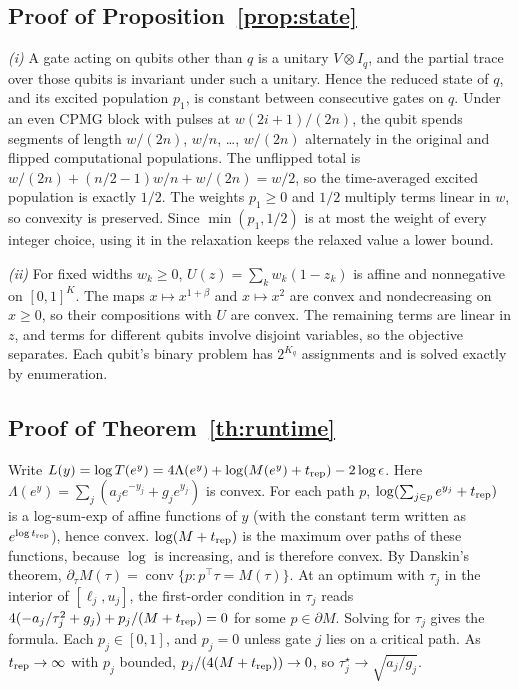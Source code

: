 \documentclass[10pt,letterpaper,journal]{IEEEtran}
\begin{document}
\subsection{Proof of Proposition~\ref{prop:state}}
\emph{(i)} A gate acting on qubits other than $q$ is a unitary $V\otimes I_q$, and the partial trace over those qubits is invariant under such a unitary. Hence the reduced state of $q$, and its excited population $p_1$, is constant between consecutive gates on $q$. Under an even CPMG block with pulses at $w(2i+1)/(2n)$, the qubit spends segments of length $w/(2n)$, $w/n$, \dots, $w/(2n)$ alternately in the original and flipped computational populations. The unflipped total is $w/(2n)+(n/2-1)w/n+w/(2n)=w/2$, so the time-averaged excited population is exactly $1/2$. The weights $p_1\ge0$ and $1/2$ multiply terms linear in $w$, so convexity is preserved. Since $\min(p_1,1/2)$ is at most the weight of every integer choice, using it in the relaxation keeps the relaxed value a lower bound.

\emph{(ii)} For fixed widths $w_k\ge0$, $U(z)=\sum_kw_k(1-z_k)$ is affine and nonnegative on $[0,1]^K$. The maps $x\mapsto x^{1+\beta}$ and $x\mapsto x^2$ are convex and nondecreasing on $x\ge0$, so their compositions with $U$ are convex. The remaining terms are linear in $z$, and terms for different qubits involve disjoint variables, so the objective separates. Each qubit's binary problem has $2^{K_q}$ assignments and is solved exactly by enumeration.

\subsection{Proof of Theorem~\ref{th:runtime}}
Write $L(y)=\log T(e^y)=4\Lambda(e^y)+\log(M(e^y)+t_{\rm rep})-2\log\epsilon$. Here $\Lambda(e^y)=\sum_j(a_je^{-y_j}+g_je^{y_j})$ is convex. For each path $p$, $\log(\sum_{j\in p}e^{y_j}+t_{\rm rep})$ is a log-sum-exp of affine functions of $y$ (with the constant term written as $e^{\log t_{\rm rep}}$), hence convex. $\log(M+t_{\rm rep})$ is the maximum over paths of these functions, because $\log$ is increasing, and is therefore convex. By Danskin's theorem, $\partial_\tau M(\tau)=\operatorname{conv}\{p:p^\top\tau=M(\tau)\}$. At an optimum with $\tau_j$ in the interior of $[\ell_j,u_j]$, the first-order condition in $\tau_j$ reads $4(-a_j/\tau_j^2+g_j)+p_j/(M+t_{\rm rep})=0$ for some $p\in\partial M$. Solving for $\tau_j$ gives the formula. Each $p_j\in[0,1]$, and $p_j=0$ unless gate $j$ lies on a critical path. As $t_{\rm rep}\to\infty$ with $p_j$ bounded, $p_j/(4(M+t_{\rm rep}))\to0$, so $\tau_j^\star\to\sqrt{a_j/g_j}$.
\end{document}
